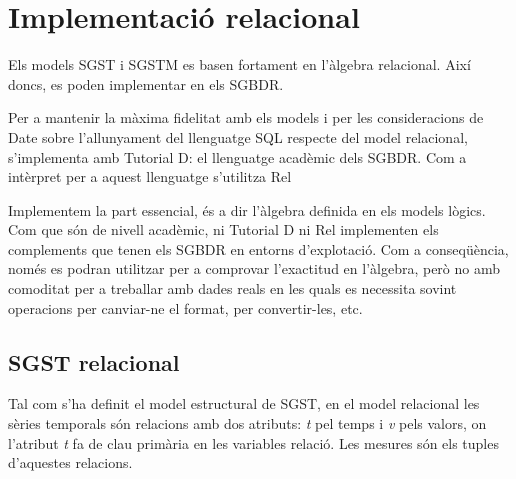 \chapter{Implementació relacional}

Els models SGST i SGSTM es basen fortament en l'àlgebra relacional.  
Així doncs, es poden implementar en els SGBDR. 


Per a mantenir la màxima fidelitat amb els models i per les
consideracions de Date sobre l'allunyament del
llenguatge SQL respecte del model relacional, s'implementa amb
Tutorial D: el llenguatge acadèmic dels SGBDR.  Com a
intèrpret per a aquest llenguatge s'utilitza Rel






Implementem la part essencial, és a dir l'àlgebra definida en els
models lògics. Com que són de nivell acadèmic, ni Tutorial D ni Rel
implementen els complements que tenen els SGBDR en entorns
d'explotació. Com a conseqüència, només es podran utilitzar per a
comprovar l'exactitud en l'àlgebra, però no amb comoditat per a
treballar amb dades reals en les quals es necessita sovint operacions per canviar-ne el format, per convertir-les, etc.\todo{}




\section{SGST relacional}


Tal com s'ha definit el model estructural de SGST, en el model
relacional les sèries temporals són relacions amb dos atributs:
\emph{t} pel temps i \emph{v} pels valors, on l'atribut \emph{t} fa de
clau primària en les variables relació.  Les mesures són els tuples
d'aquestes relacions. 

